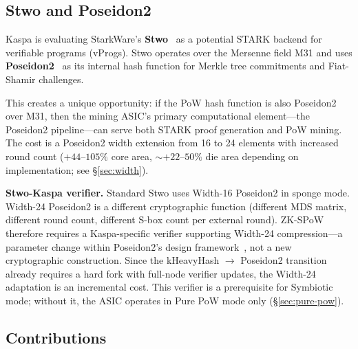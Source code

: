 \documentclass[11pt,a4paper]{article}
\begin{document}
\subsection{Stwo and Poseidon2}

Kaspa is evaluating StarkWare's \textbf{Stwo}~\cite{stwo} as a potential STARK backend for verifiable programs (vProgs). Stwo operates over the Mersenne field M31 and uses \textbf{Poseidon2}~\cite{poseidon2} as its internal hash function for Merkle tree commitments and Fiat-Shamir challenges.

This creates a unique opportunity: if the PoW hash function is also Poseidon2 over M31, then the mining ASIC's primary computational element---the Poseidon2 pipeline---can serve both STARK proof generation and PoW mining. The cost is a Poseidon2 width extension from 16 to 24 elements with increased round count ($+44$--$105\%$ core area, ${\sim}+22$--$50\%$ die area depending on implementation; see \S\ref{sec:width}).

\textbf{Stwo-Kaspa verifier.} Standard Stwo uses Width-16 Poseidon2 in sponge mode. Width-24 Poseidon2 is a different cryptographic function (different MDS matrix, different round count, different S-box count per external round). ZK-SPoW therefore requires a Kaspa-specific verifier supporting Width-24 compression---a parameter change within Poseidon2's design framework~\cite{poseidon2}, not a new cryptographic construction. Since the kHeavyHash $\to$ Poseidon2 transition already requires a hard fork with full-node verifier updates, the Width-24 adaptation is an incremental cost. This verifier is a prerequisite for Symbiotic mode; without it, the ASIC operates in Pure PoW mode only (\S\ref{sec:pure-pow}).

\subsection{Contributions}
\label{sec:contributions}
\end{document}
